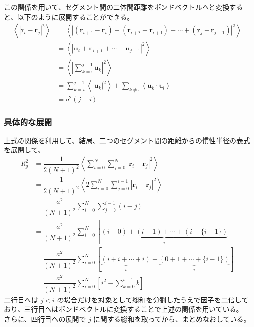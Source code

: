 \documentclass[a4paper,11pt]{ltjsarticle}
\begin{document}
\begin{appendix}
この関係を用いて、セグメント間の二体間距離をボンドベクトルへと変換すると、以下のように展開することができる。
\begin{align*}
\left \langle \left | \bm{r}_i - \bm{r}_j \right |^2 \right \rangle
	&= \left \langle \left | (\bm{r}_{i+1} - \bm{r}_i) + (\bm{r}_{i+2} - \bm{r}_{i+1}) + \cdots + (\bm{r}_j - \bm{r}_{j-1}) \right |^2 \right \rangle \\
	&= \left \langle \left | \bm{u}_i + \bm{u}_{i+1} + \cdots + \bm{u}_{j-1} \right |^2 \right \rangle \\
	&= \left \langle \left| \sum_{k=i}^{j-1} \bm{u}_{k} \right|^2 \right\rangle \\
	&= \sum_{k=i}^{j-1} \left \langle \left| \bm{u}_{k} \right|^2 \right\rangle + \sum_{k \neq l} \left \langle \bm{u}_{k} \cdot \bm{u}_{l} \right\rangle \\
	&= a^2(j-i)
\end{align*}


\subsubsection{具体的な展開}


上式の関係を利用して、結局、二つのセグメント間の距離からの慣性半径の表式を展開して、
\begin{align*}
R_g^2 
	&= \dfrac{1}{2(N+1)^2} \left \langle \sum_{i=0}^N \sum_{j=0}^N \left|\bm{r}_i - \bm{r}_j \right|^2 \right \rangle\\
	&= \dfrac{1}{2(N+1)^2} \left \langle 2 \sum_{i=0}^N \sum_{j=0}^{i-1} \left|\bm{r}_i - \bm{r}_j \right|^2 \right \rangle\\
	&= \dfrac{a^2}{(N+1)^2} \sum_{i=0}^N \sum_{j=0}^{i-1} (i -j) \\
	&= \dfrac{a^2}{(N+1)^2} \sum_{i=0}^N \left[ \underbrace{(i -0) +(i -1) + \cdots + (i -\{i-1\} ) }_i \right]\\
	&= \dfrac{a^2}{(N+1)^2} \sum_{i=0}^N \left[ \underbrace{(i+i+ \cdots +i ) }_i - \underbrace{(0+1+ \cdots + \{i-1\} ) }_i\right]\\
	&= \dfrac{a^2}{(N+1)^2} \sum_{i=0}^N \left[ i^2 - \sum_{k=0}^{i-1} k \right]
\end{align*}
二行目へは $j < i$ の場合だけを対象として総和を分割したうえで因子を二倍しており、三行目へはボンドベクトルに変換することで上述の関係を用いている。
さらに、四行目への展開で $j$ に関する総和を取ってから、まとめなおしている。


\end{appendix}
\end{document}
